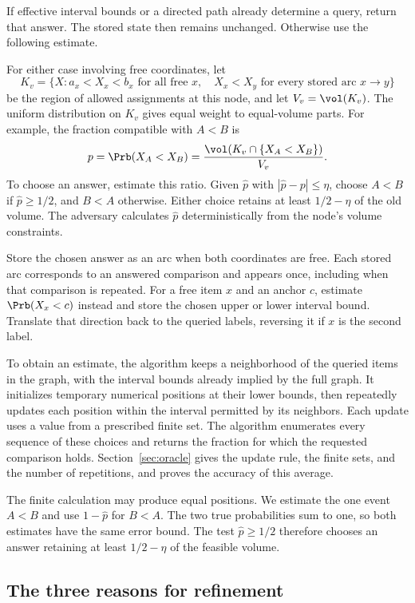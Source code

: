 If effective interval bounds or a directed path already determine a query,
return that answer. The stored state then remains unchanged. Otherwise
use the following estimate.

For either case involving free coordinates, let
\begin{equation}\label{eq:node-region}
K_v=\{X:a_x<X_x<b_x\text{ for all free }x,
             \quad X_x<X_y\text{ for every stored arc }x\to y\}
\end{equation}
be the region of allowed assignments at this node, and let $V_v=\vol(K_v)$.
The uniform distribution on $K_v$ gives equal weight to equal-volume parts.
For example, the fraction compatible with $A<B$ is
\[
p=\Prb(X_A<X_B)=\frac{\vol(K_v\cap\{X_A<X_B\})}{V_v}.
\]
To choose an answer, estimate this ratio.
Given $\widehat p$ with $|\widehat p-p|\le\eta$, choose $A<B$ if
$\widehat p\ge1/2$, and $B<A$ otherwise. Either choice retains at least
$1/2-\eta$ of the old volume. The adversary calculates $\widehat p$ deterministically from the node's
volume constraints.

Store the chosen answer as an arc when both coordinates are free.
Each stored arc corresponds to an answered comparison and appears once,
including when that comparison is repeated.
For a free item $x$ and an anchor $c$, estimate $\Prb(X_x<c)$ instead and
store the chosen upper or lower interval bound. Translate that direction
back to the queried labels, reversing it if $x$ is the second label.

To obtain an estimate, the algorithm keeps a neighborhood of the queried
items in the graph, with the interval bounds already implied by the full
graph. It initializes temporary numerical positions at their lower bounds,
then repeatedly updates each position within the interval permitted by its
neighbors. Each update uses a value from a prescribed finite set. The
algorithm enumerates every sequence of these choices and returns the
fraction for which the requested comparison holds.
Section~\ref{sec:oracle} gives the update rule, the finite sets, and the
number of repetitions, and proves the accuracy of this average.

The finite calculation may produce equal positions. We estimate the one
event $A<B$ and use $1-\widehat p$ for $B<A$. The two true probabilities
sum to one, so both estimates have the same error bound. The test
$\widehat p\ge1/2$ therefore chooses an answer retaining at least
$1/2-\eta$ of the feasible volume.

\subsection{The three reasons for refinement}

